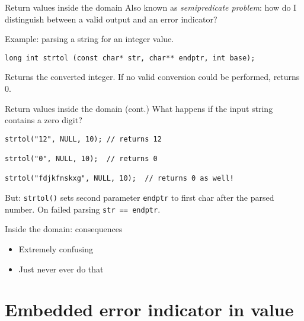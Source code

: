 \documentclass[aspectratio=169,14pt]{beamer}
\begin{document}
\begin{frame}[fragile]{Return values inside the domain}
Also known as \textit{semipredicate problem}: how do I distinguish between a valid output and an error indicator?

Example: parsing a string for an integer value.

\begin{lstlisting}[style=cstyle]
long int strtol (const char* str, char** endptr, int base);
\end{lstlisting}

Returns the converted integer. If no valid conversion could be performed, returns 0.
\end{frame}



\begin{frame}[fragile]{Return values inside the domain (cont.)}
What happens if the input string contains a zero digit?

\begin{lstlisting}[style=cstyle]
strtol("12", NULL, 10); // returns 12

strtol("0", NULL, 10);  // returns 0

strtol("fdjkfnskxg", NULL, 10);  // returns 0 as well!
\end{lstlisting}

But: \texttt{strtol()} sets second parameter \texttt{endptr} to first char after the parsed number. On failed parsing \texttt{str == endptr}.
\end{frame}




\begin{frame}[fragile]{Inside the domain: consequences}
\begin{itemize}
    \item[\bad] Extremely confusing
    \item[\bad] Just never ever do that
\end{itemize}
\end{frame}




\section{Embedded error indicator in value}
\end{document}

